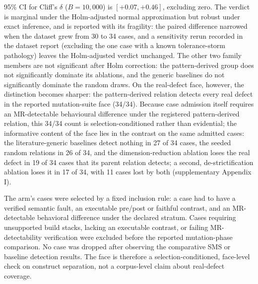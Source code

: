 \documentclass[manuscript,screen,review]{acmart}
\begin{document}
95\% CI for Cliff's \(\delta\) (\(B = 10{,}000\)) is
\([+0.07, +0.46]\), excluding zero. The verdict is marginal under the
Holm-adjusted normal approximation but robust under exact inference, and
is reported with its fragility: the paired difference narrowed when the
dataset grew from 30 to 34 cases, and a sensitivity rerun recorded in the dataset report
(excluding the one case with a known tolerance-storm pathology) leaves
the Holm-adjusted verdict unchanged. The other two family members are
not significant after Holm correction: the pattern-derived group does
not significantly dominate its ablations, and the generic baselines do
not significantly dominate the random draws. On the real-defect face, however, the distinction becomes
sharper: the pattern-derived relation detects every real defect in the
reported mutation-suite face (34/34). Because case admission itself
requires an MR-detectable behavioural difference under the registered
pattern-derived relation, this 34/34 count is selection-conditioned
rather than evidential; the informative content of the face lies in the
contrast on the same admitted cases: the literature-generic baselines
detect nothing in 27 of 34 cases, the seeded random relations in 26 of
34, and the dimension-reduction ablation loses the real defect in 19 of
34 cases that its parent relation detects; a second, de-strictification
ablation loses it in 17 of 34, with 11 cases lost by both (supplementary
Appendix I).

The arm's cases were selected by a fixed inclusion rule: a case had to have a
verified semantic fault, an executable pre/post or faithful contrast, and
an MR-detectable behavioral difference under the declared stratum.
Cases requiring unsupported build stacks, lacking an executable contrast,
or failing MR-detectability verification were excluded before the
reported mutation-phase comparison. No case was dropped after observing
the comparative SMS or baseline detection results. The face is therefore a selection-conditioned, face-level check on
construct separation, not a corpus-level claim about real-defect
coverage.
\end{document}
